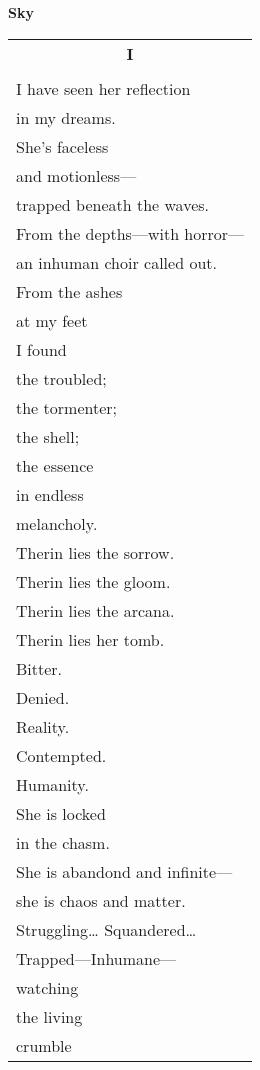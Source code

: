 \documentclass{article}
\begin{document}
\newcommand{\h}{\hspace*{2ex}}
\newcommand{\HHHH}{\hspace*{32ex}}
\begin{center}
{\large\textbf{Sky}} \\
\begin{tabular}{l}
\multicolumn{1}{c}{\large\textbf{I}} \\
\\
I have seen her reflection \\
\h in my dreams. \\
She's faceless \\
\h and motionless--- \\
\h\h trapped beneath the waves. \\ %
From the depths---with horror--- \\
\h an inhuman choir called out. \\ %
From the ashes \\
\h at my feet \\
\h\h I found \\
the troubled; \\
\h the tormenter; \\
\h\h the shell; \\
\h\h\h the essence \\ %
in endless \\
\h melancholy.\\
Therin lies the sorrow. \\
Therin lies the gloom. \\
Therin lies the arcana. \\
Therin lies her tomb. \\
\h Bitter. \\
\h\h Denied. \\
\h\h\h Reality. \\
\h Contempted. \\
\h\h Humanity. \\
She is locked \\
\h in the chasm. \\
She is abandond and infinite--- \\
\h she is chaos and matter. \\ %
Struggling\ldots{} Squandered\ldots \\
\h Trapped---Inhumane--- \\
\h\h watching \\
\h\h\h the living \\
\h\h\h\h crumble \\

\end{tabular}
\end{center}
\end{document}
